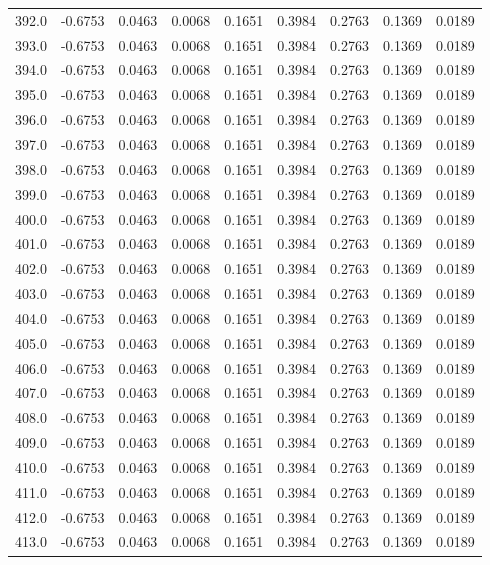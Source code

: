 \begin{longtable}{lrrrrrrrr}
392.0 & -0.6753 & 0.0463 & 0.0068 & 0.1651 & 0.3984 & 0.2763 & 0.1369 & 0.0189 \\
393.0 & -0.6753 & 0.0463 & 0.0068 & 0.1651 & 0.3984 & 0.2763 & 0.1369 & 0.0189 \\
394.0 & -0.6753 & 0.0463 & 0.0068 & 0.1651 & 0.3984 & 0.2763 & 0.1369 & 0.0189 \\
395.0 & -0.6753 & 0.0463 & 0.0068 & 0.1651 & 0.3984 & 0.2763 & 0.1369 & 0.0189 \\
396.0 & -0.6753 & 0.0463 & 0.0068 & 0.1651 & 0.3984 & 0.2763 & 0.1369 & 0.0189 \\
397.0 & -0.6753 & 0.0463 & 0.0068 & 0.1651 & 0.3984 & 0.2763 & 0.1369 & 0.0189 \\
398.0 & -0.6753 & 0.0463 & 0.0068 & 0.1651 & 0.3984 & 0.2763 & 0.1369 & 0.0189 \\
399.0 & -0.6753 & 0.0463 & 0.0068 & 0.1651 & 0.3984 & 0.2763 & 0.1369 & 0.0189 \\
400.0 & -0.6753 & 0.0463 & 0.0068 & 0.1651 & 0.3984 & 0.2763 & 0.1369 & 0.0189 \\
401.0 & -0.6753 & 0.0463 & 0.0068 & 0.1651 & 0.3984 & 0.2763 & 0.1369 & 0.0189 \\
402.0 & -0.6753 & 0.0463 & 0.0068 & 0.1651 & 0.3984 & 0.2763 & 0.1369 & 0.0189 \\
403.0 & -0.6753 & 0.0463 & 0.0068 & 0.1651 & 0.3984 & 0.2763 & 0.1369 & 0.0189 \\
404.0 & -0.6753 & 0.0463 & 0.0068 & 0.1651 & 0.3984 & 0.2763 & 0.1369 & 0.0189 \\
405.0 & -0.6753 & 0.0463 & 0.0068 & 0.1651 & 0.3984 & 0.2763 & 0.1369 & 0.0189 \\
406.0 & -0.6753 & 0.0463 & 0.0068 & 0.1651 & 0.3984 & 0.2763 & 0.1369 & 0.0189 \\
407.0 & -0.6753 & 0.0463 & 0.0068 & 0.1651 & 0.3984 & 0.2763 & 0.1369 & 0.0189 \\
408.0 & -0.6753 & 0.0463 & 0.0068 & 0.1651 & 0.3984 & 0.2763 & 0.1369 & 0.0189 \\
409.0 & -0.6753 & 0.0463 & 0.0068 & 0.1651 & 0.3984 & 0.2763 & 0.1369 & 0.0189 \\
410.0 & -0.6753 & 0.0463 & 0.0068 & 0.1651 & 0.3984 & 0.2763 & 0.1369 & 0.0189 \\
411.0 & -0.6753 & 0.0463 & 0.0068 & 0.1651 & 0.3984 & 0.2763 & 0.1369 & 0.0189 \\
412.0 & -0.6753 & 0.0463 & 0.0068 & 0.1651 & 0.3984 & 0.2763 & 0.1369 & 0.0189 \\
413.0 & -0.6753 & 0.0463 & 0.0068 & 0.1651 & 0.3984 & 0.2763 & 0.1369 & 0.0189 \\

\end{longtable}
